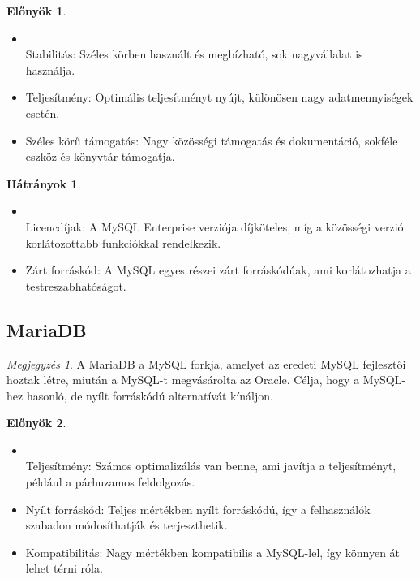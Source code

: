 \documentclass[colorlinks]{thesis-kando}
\theoremstyle{definition}
\newtheorem{elonyok}{Előnyök}
\newtheorem{hatranyok}{Hátrányok}
\theoremstyle{remark}
\newtheorem{megjegyzes}[tetel]{Megjegyzés}
\begin{document}
\begin{elonyok}
    \begin{itemize}
        \item \mbox{} \\Stabilitás: Széles körben használt és megbízható, sok nagyvállalat is használja.
        \item Teljesítmény: Optimális teljesítményt nyújt, különösen nagy adatmennyiségek esetén.
        \item Széles körű támogatás: Nagy közösségi támogatás és dokumentáció, sokféle eszköz és könyvtár támogatja.
    \end{itemize}
    \end{elonyok}
    \mbox \\
    \begin{hatranyok}
    \begin{itemize}
        \item \mbox{} \\Licencdíjak: A MySQL Enterprise verziója díjköteles, míg a közösségi verzió korlátozottabb funkciókkal rendelkezik.
        \item Zárt forráskód: A MySQL egyes részei zárt forráskódúak, ami korlátozhatja a testreszabhatóságot.
    \end{itemize}
    \end{hatranyok}

\subsection{MariaDB}

\begin{megjegyzes}
    A MariaDB a MySQL forkja, amelyet az eredeti MySQL fejlesztői hoztak létre, miután a MySQL-t megvásárolta az Oracle. Célja, hogy a MySQL-hez hasonló, de nyílt forráskódú alternatívát kínáljon.
\end{megjegyzes}

\begin{elonyok}
    \begin{itemize}
        \item \mbox{} \\Teljesítmény: Számos optimalizálás van benne, ami javítja a teljesítményt, például a párhuzamos feldolgozás.
        \item Nyílt forráskód: Teljes mértékben nyílt forráskódú, így a felhasználók szabadon módosíthatják és terjeszthetik.
        \item Kompatibilitás: Nagy mértékben kompatibilis a MySQL-lel, így könnyen át lehet térni róla.
    \end{itemize}
    \end{elonyok}
    
\end{document}
